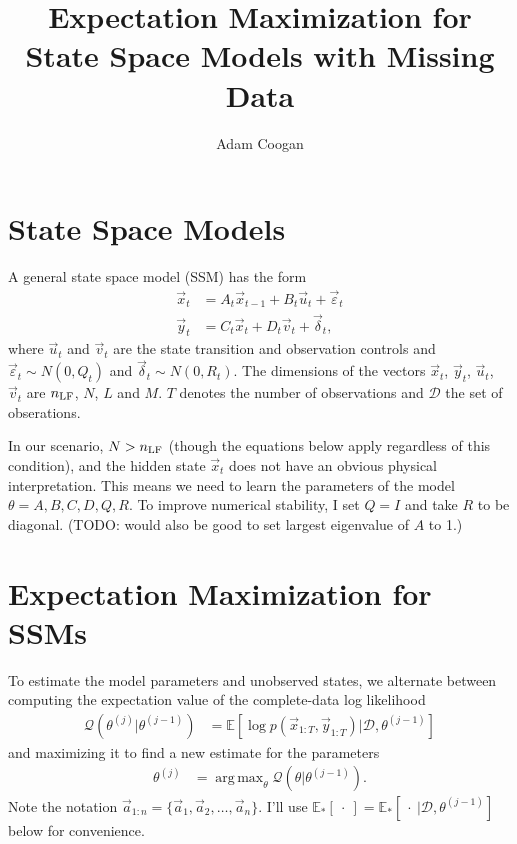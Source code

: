 \documentclass[10pt]{article}
\DeclareMathOperator*{\argmax}{arg\,max}
\newcommand\nlf{n_{\rm LF}}
\newcommand\e{\mathbb{E}}
\begin{document}
 
\title{Expectation Maximization for State Space Models with Missing Data}
\author{Adam Coogan}
\maketitle

\section{State Space Models}

A general state space model (SSM) has the form
\begin{align}
    \vec{x}_t &= A_t \vec{x}_{t-1} + B_t \vec{u}_t + \vec{\varepsilon}_t\\
    \vec{y}_t &= C_t \vec{x}_t + D_t \vec{v}_t + \vec{\delta}_t,
\end{align}
where $\vec{u}_t$ and $\vec{v}_t$ are the state transition and observation controls and $\vec{\varepsilon}_t \sim N(0, Q_t)$ and $\vec{\delta}_t \sim N(0, R_t)$. The dimensions of the vectors $\vec{x}_t$, $\vec{y}_t$, $\vec{u}_t$, $\vec{v}_t$ are $\nlf$, $N$, $L$ and $M$. $T$ denotes the number of observations and $\mathcal{D}$ the set of obserations.

In our scenario, $N > \nlf$ (though the equations below apply regardless of this condition), and the hidden state $\vec{x}_t$ does not have an obvious physical interpretation. This means we need to learn the parameters of the model $\theta = {A, B, C, D, Q, R}$. To improve numerical stability, I set $Q = I$ and take $R$ to be diagonal. (TODO: would also be good to set largest eigenvalue of $A$ to 1.)

\section{Expectation Maximization for SSMs}

To estimate the model parameters and unobserved states, we alternate between computing the expectation value of the complete-data log likelihood
\begin{align}
    \mathcal{Q}(\theta^{(j)} | \theta^{(j-1)}) &= \e[\log p(\vec{x}_{1:T}, \vec{y}_{1:T}) | \mathcal{D}, \theta^{(j-1)}]
\end{align}
and maximizing it to find a new estimate for the parameters
\begin{align}
    \theta^{(j)} &= \argmax_{\theta} \mathcal{Q}(\theta | \theta^{(j-1)}).
\end{align}
Note the notation $\vec{a}_{1:n} = \{\vec{a}_1, \vec{a}_2, \dots, \vec{a}_n\}$. I'll use $\e_*[\ \cdot\ ] = \e_*[\ \cdot\ | \mathcal{D}, \theta^{(j-1)}]$ below for convenience.
\end{document}

